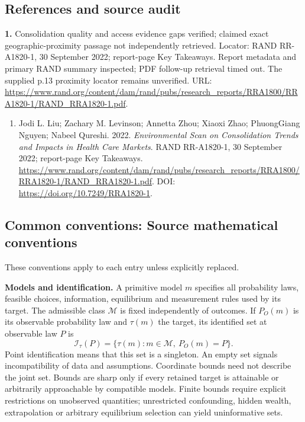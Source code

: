 \documentclass[11pt,a4paper]{article}
\begin{document}
\subsection*{References and source audit}
\textbf{1.} Consolidation quality and access evidence gaps verified; claimed exact geographic-proximity passage not independently retrieved. Locator: RAND RR-A1820-1, 30 September 2022; report-page Key Takeaways. Report metadata and primary RAND summary inspected; PDF follow-up retrieval timed out. The supplied p.13 proximity locator remains unverified. URL: \url{https://www.rand.org/content/dam/rand/pubs/research_reports/RRA1800/RRA1820-1/RAND_RRA1820-1.pdf}.
\begin{enumerate}\raggedright
\item\hypertarget{definitions:source:30007723:1}{} Jodi L. Liu; Zachary M. Levinson; Annetta Zhou; Xiaoxi Zhao; PhuongGiang Nguyen; Nabeel Qureshi. 2022. \emph{Environmental Scan on Consolidation Trends and Impacts in Health Care Markets}. RAND RR-A1820-1, 30 September 2022; report-page Key Takeaways.
\url{https://www.rand.org/content/dam/rand/pubs/research_reports/RRA1800/RRA1820-1/RAND_RRA1820-1.pdf}.
DOI: \url{https://doi.org/10.7249/RRA1820-1}.
\end{enumerate}

\subsection*{Common conventions: Source mathematical conventions}

These conventions apply to each entry unless explicitly replaced.

\textbf{Models and identification.} A primitive model \(m\) specifies all probability laws, feasible choices, information, equilibrium and measurement rules used by its target. The admissible class \(\mathcal M\) is fixed independently of outcomes. If \(P_O(m)\) is its observable probability law and \(\tau(m)\) the target, its identified set at observable law \(P\) is
\[
 \mathcal I_\tau(P)=\{\tau(m):m\in\mathcal M,\ P_O(m)=P\}.
\]
Point identification means that this set is a singleton. An empty set signals incompatibility of data and assumptions. Coordinate bounds need not describe the joint set. Bounds are sharp only if every retained target is attainable or arbitrarily approachable by compatible models. Finite bounds require explicit restrictions on unobserved quantities; unrestricted confounding, hidden wealth, extrapolation or arbitrary equilibrium selection can yield uninformative sets.
\end{document}
